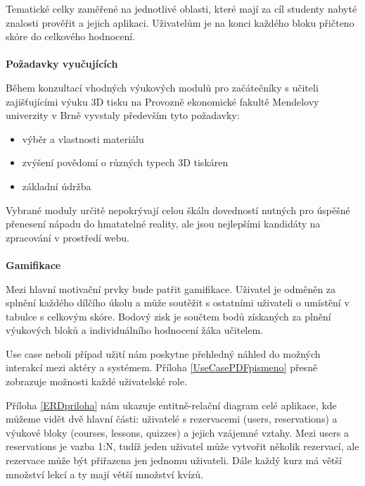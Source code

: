 \documentclass[twoside, 12pt]{article}
\begin{document}
Tematické celky zaměřené na jednotlivé oblasti, které mají za cíl studenty nabyté znalosti prověřit a jejich aplikaci. Uživatelům je na konci každého bloku přičteno skóre do celkového hodnocení.
\\
\\
\textbf{Požadavky vyučujících}

Během konzultací vhodných výukových modulů pro začátečníky s učiteli zajišťujícími výuku 3D tisku na Provozně ekonomické fakultě Mendelovy univerzity v Brně vyvstaly především tyto požadavky:
\clearpage
\begin{itemize}
    \item výběr a vlastnosti materiálu
    \item zvýšení povědomí o různých typech 3D tiskáren
    \item základní údržba
\end{itemize}

Vybrané moduly určitě nepokrývají celou škálu dovedností nutných pro úspěšné přenesení nápadu do hmatatelné reality, ale jsou nejlepšími kandidáty na zpracování v prostředí webu.
\\
\\
\textbf{Gamifikace}

Mezi hlavní motivační prvky bude patřit gamifikace. Uživatel je odměněn za splnění každého dílčího úkolu a může soutěžit s ostatními uživateli o umístění v tabulce s celkovým skóre. Bodový zisk je součtem bodů získaných za plnění výukových bloků a individuálního hodnocení žáka učitelem.



Use case neboli případ užití nám poskytne přehledný náhled do možných interakcí mezi aktéry a systémem. Příloha \ref{UseCasePDFpismeno} přesně zobrazuje možnosti každé uživatelské role.




Příloha \ref{ERDpriloha} nám ukazuje entitně-relační diagram celé aplikace, kde můžeme vidět dvě hlavní části: uživatelé s rezervacemi (users, reservations) a výukové bloky (courses, lessons, quizzes) a jejich vzájemné vztahy. Mezi users a reservations je vazba 1:N, tudíž jeden uživatel může vytvořit několik rezervací, ale rezervace může být přiřazena jen jednomu uživateli. Dále každý kurz má větší množství lekcí a ty mají větší množství kvízů.
\end{document}
